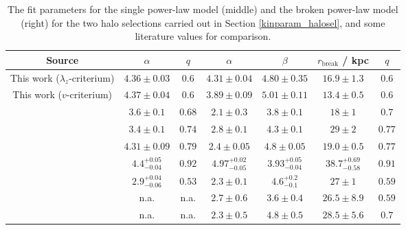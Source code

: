 \documentclass[a4paper,11pt]{article}
\begin{document}
\begin{table}[ht]
\centering
\caption[Halo number density fits and literature references]{The fit parameters for the single power-law model (middle) and the broken power-law model (right) for the two halo selections carried out in Section \ref{kinparam_halosel}, and some literature values for comparison.}
\label{tab:powerlaw_fits}
\begin{tabular}{|c||c|c||c|c|c|c|}
  \hline
  Source & $\alpha$ & $q$ & $\alpha$ & $\beta$ & $r_\mathrm{break}$ / kpc & $q$ \\
  \hline\hline
  This work ($\lambda_z$-criterium) & $4.36\pm0.03$ & $0.6$ & $4.31\pm0.04$ & $4.80\pm0.35$ & $16.9\pm1.3$ & $0.6$ \\
  \hline
  This work ($v$-criterium) & $4.37\pm0.04$ & $0.6$ & $3.89\pm0.09$ & $5.01\pm0.11$ & $13.4\pm0.5$ & $0.6$ \\
  \hline\hline
  \citet{xue15} & $3.6\pm0.1$ & $0.68$ & $2.1\pm0.3$ & $3.8\pm0.1$ & $18\pm1$ & $0.7$ \\
  \hline
  \citet{xue15} & $3.4\pm0.1$ & $0.74$ & $2.8\pm0.1$ & $4.3\pm0.1$ & $29\pm2$ & $0.77$ \\
  \hline
  \citet{piladiez15} & $4.31\pm0.09$ & $0.79$ & $2.4\pm0.05$ & $4.8\pm0.05$ & $19.0\pm0.5$ & $0.77$ \\
  \hline
  \citet{hernitschek18} & $4.4^{+0.05}_{-0.04}$ & $0.92$ & $4.97^{+0.02}_{-0.05}$ & $3.93^{+0.05}_{-0.04}$ & $38.7^{+0.69}_{-0.58}$ & $0.91$ \\
  \hline
  \citet{deason11} & $2.9^{+0.04}_{-0.06}$ & $0.53$ & $2.3\pm0.1$ & $4.6^{+0.2}_{-0.1}$ & $27\pm1$ & $0.59$ \\
  \hline
  \citet{faccioli14} & n.a. & n.a. & $2.7\pm0.6$ & $3.6\pm0.4$ & $26.5\pm8.9$ & $0.59$ \\
  \hline
  \citet{faccioli14} & n.a. & n.a. & $2.3\pm0.5$ & $4.8\pm0.5$ & $28.5\pm5.6$ & $0.7$ \\
  \hline
\end{tabular}
\end{table}\\ \\
%
\end{document}
